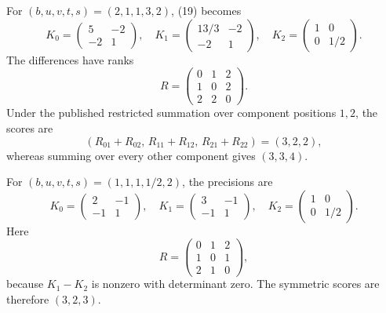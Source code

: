 For \((b,u,v,t,s)=(2,1,1,3,2)\), (19) becomes
\[
 K_0=\begin{pmatrix}5&-2\\-2&1\end{pmatrix},\quad
 K_1=\begin{pmatrix}13/3&-2\\-2&1\end{pmatrix},\quad
 K_2=\begin{pmatrix}1&0\\0&1/2\end{pmatrix}.
\]
The differences have ranks
\[
 R=\begin{pmatrix}0&1&2\\1&0&2\\2&2&0\end{pmatrix}.                \tag{20}
\]
Under the published restricted summation over component positions
\(1,2\), the scores are
\[
 (R_{01}+R_{02},\,R_{11}+R_{12},\,R_{21}+R_{22})=(3,2,2),
\]
whereas summing over every other component gives \((3,3,4)\).

For \((b,u,v,t,s)=(1,1,1,1/2,2)\), the precisions are
\[
 K_0=\begin{pmatrix}2&-1\\-1&1\end{pmatrix},\quad
 K_1=\begin{pmatrix}3&-1\\-1&1\end{pmatrix},\quad
 K_2=\begin{pmatrix}1&0\\0&1/2\end{pmatrix}.
\]
Here
\[
 R=\begin{pmatrix}0&1&2\\1&0&1\\2&1&0\end{pmatrix},
\]
because \(K_1-K_2\) is nonzero with determinant zero.  The symmetric
scores are therefore \((3,2,3)\).

